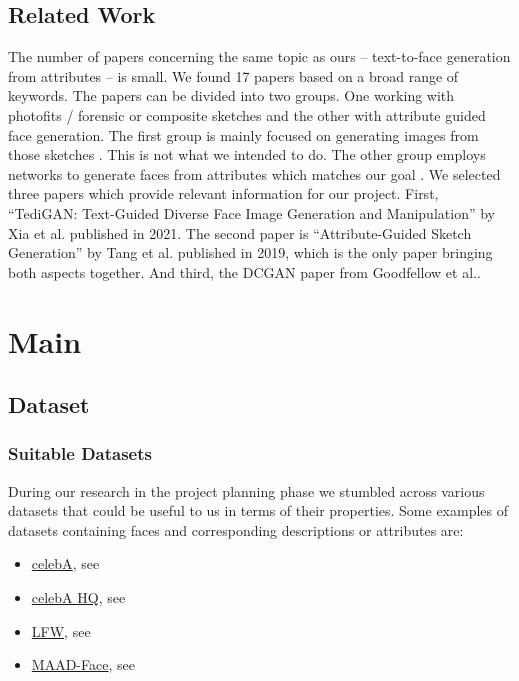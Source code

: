 \documentclass[12pt, a4paper]{article}
\begin{document}
\subsection{Related Work}
The number of papers concerning the same topic as ours -- text-to-face generation from attributes -- is small. We found 17 papers based on a broad range of keywords.
The papers can be divided into two groups. One working with photofits / forensic or composite sketches and the other with attribute guided face generation.
The first group is mainly focused on generating images from those sketches \cite{6359918, LEI202013, SANNIDHAN2019452}. This is not what we intended to do. 
The other group employs networks to generate faces from attributes which matches our goal \cite{Xia_2021_CVPR,Lu_2018_ECCV,9117185,9320290,9412022,8462648,Gecer_2018_ECCV,8606936,9146375,Bodla_2018_ECCV,NIPS2016_b1301141,gauthier2014conditional,Xiao_2018_ECCV}.
We selected three papers which provide relevant information for our project. First, ``TediGAN: Text-Guided Diverse Face Image Generation and Manipulation'' by Xia
et al. published in 2021\cite{Xia_2021_CVPR}. The second paper is ``Attribute-Guided Sketch Generation'' by Tang et al. published in 2019\cite{Tang}, which is 
the only paper bringing both aspects together. And third, the DCGAN paper from Goodfellow et al.\cite{dcgan}.

\section{Main}
\subsection{Dataset}
\subsubsection{Suitable Datasets}\label{SuitableDatasets}
During our research in the project planning phase we stumbled across various datasets that could be useful to us in
terms of their properties. Some examples of datasets containing faces and corresponding descriptions or attributes are:
\begin{itemize}
    \item \href{https://mmlab.ie.cuhk.edu.hk/projects/CelebA.html}{celebA}, see \cite{celebA}
    \item \href{http://mmlab.ie.cuhk.edu.hk/projects/CelebA/CelebAMask_HQ.html#:~:text=CelebAMask\%2DHQ\%20is\%20a\%20large,facial\%20attributes\%20corresponding\%20to\%20CelebA}{celebA HQ}, see \cite{CelebAMask-HQ}
    \item \href{http://vis-www.cs.umass.edu/lfw/}{LFW}, see \cite{LFW}
    \item \href{https://github.com/pterhoer/MAAD-Face}{MAAD-Face}, see \cite{DBLP2}
\end{itemize}
\end{document}
